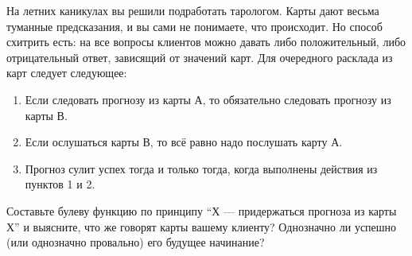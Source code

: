 \question
На летних каникулах вы решили подработать тарологом. Карты дают весьма туманные предсказания, и вы сами не понимаете, что происходит. Но способ схитрить есть: на все вопросы клиентов можно давать либо положительный, либо отрицательный ответ, зависящий от значений карт. Для очередного расклада из карт следует следующее:

\begin{enumerate}
\item Если следовать прогнозу из карты А, то обязательно следовать прогнозу из карты В.
\item Если ослушаться карты В, то всё равно надо послушать карту А.
\item Прогноз сулит успех тогда и только тогда, когда выполнены действия из пунктов 1 и 2.
\end{enumerate}

Составьте булеву функцию по принципу “Х — придержаться прогноза из карты Х” и выясните, что же говорят карты вашему клиенту? Однозначно ли успешно (или однозначно провально) его будущее начинание?